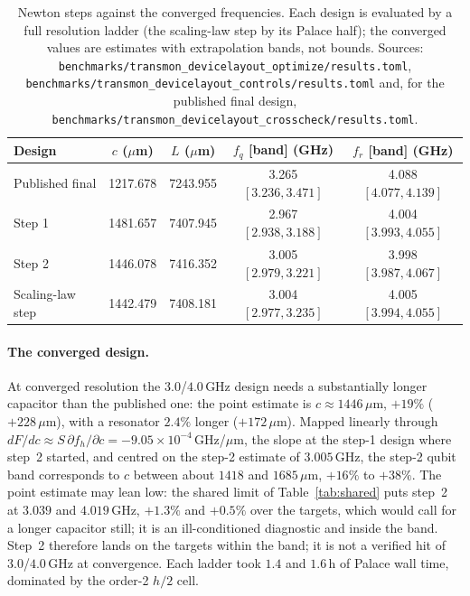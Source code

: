 \documentclass{anvil-paper}
\begin{document}
\begin{table}[htbp]
  \centering
  \caption{Newton steps against the converged frequencies. Each design is
  evaluated by a full resolution ladder (the scaling-law step by its Palace
  half); the converged values are estimates with extrapolation bands, not
  bounds. Sources:
  \texttt{benchmarks/transmon\_devicelayout\_optimize/results.toml},
  \texttt{benchmarks/transmon\_devicelayout\_controls/results.toml}
  and, for the published final design,
  \texttt{benchmarks/transmon\_devicelayout\_crosscheck/results.toml}.}
  \label{tab:newton-conv}
  \small
  \begin{tabular}{@{}lcccc@{}}
    \toprule
    Design & $c$ ($\mu$m) & $L$ ($\mu$m) & $f_q$ [band] (GHz) & $f_r$ [band] (GHz) \\
    \midrule
    Published final & 1217.678 & 7243.955 & 3.265 $[3.236, 3.471]$ & 4.088 $[4.077, 4.139]$ \\
    Step 1 & 1481.657 & 7407.945 & 2.967 $[2.938, 3.188]$ & 4.004 $[3.993, 4.055]$ \\
    Step 2 & 1446.078 & 7416.352 & 3.005 $[2.979, 3.221]$ & 3.998 $[3.987, 4.067]$ \\
    Scaling-law step & 1442.479 & 7408.181 & 3.004 $[2.977, 3.235]$ & 4.005 $[3.994, 4.055]$ \\
    \bottomrule
  \end{tabular}
\end{table}

\paragraph{The converged design.}
At converged resolution the $3.0$/$4.0$\,GHz design needs a substantially
longer capacitor than the published one: the point estimate is
$c \approx 1446\,\mu$m, $+19\%$ ($+228\,\mu$m), with a resonator $2.4\%$
longer ($+172\,\mu$m). Mapped linearly through $dF/dc \approx
S\,\partial f_h/\partial c = -9.05\times10^{-4}$\,GHz/$\mu$m, the
slope at the step-1 design where step~2 started, and centred on the
step-2 estimate of $3.005$\,GHz, the step-2 qubit band corresponds to
$c$ between about $1418$ and $1685\,\mu$m, $+16\%$ to $+38\%$. The point
estimate may lean low: the shared limit of Table~\ref{tab:shared} puts
step~2 at $3.039$ and $4.019$\,GHz, $+1.3\%$ and $+0.5\%$ over the
targets, which would call for a longer capacitor still; it is an
ill-conditioned diagnostic and inside the band. Step~2 therefore lands on
the targets within the band; it is not a verified hit of $3.0$/$4.0$\,GHz
at convergence. Each ladder took $1.4$ and $1.6$\,h of Palace wall time,
dominated by the order-2 $h/2$ cell.
\end{document}

